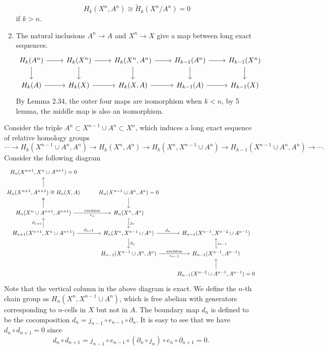 \documentclass[a4paper, 12pt]{article}
\begin{document}
\begin{solution}
\begin{claimproof}
\begin{enumerate}[(1)]
\[H_k(X^n,A^n)\cong \tilde{H}_k(X^n/A^n)=0\]
if \(k>n\).
\item The natural inclusions \(A^n\rightarrow A\) and \(X^n\rightarrow X\) give a map between long exact sequences.
\[\begin{tikzcd}
	{H_k(A^n)} & {H_k(X^n)} & {H_k(X^n,A^n)} & {H_{k-1}(A^n)} & {H_{k-1}(X^n)} \\
	{H_k(A)} & {H_k(X)} & {H_k(X,A)} & {H_{k-1}(A)} & {H_{k-1}(X)}
	\arrow[from=1-1, to=1-2]
	\arrow[from=1-1, to=2-1]
	\arrow[from=1-2, to=1-3]
	\arrow[from=1-2, to=2-2]
	\arrow[from=1-3, to=1-4]
	\arrow[from=1-3, to=2-3]
	\arrow[from=1-4, to=1-5]
	\arrow[from=1-4, to=2-4]
	\arrow[from=1-5, to=2-5]
	\arrow[from=2-1, to=2-2]
	\arrow[from=2-2, to=2-3]
	\arrow[from=2-3, to=2-4]
	\arrow[from=2-4, to=2-5]
\end{tikzcd}\]
By Lemma 2.34, the outer four maps are isomorphism when \(k<n\), by 5 lemma, the middle map is also an isomorphism.
\end{enumerate}
\end{claimproof}

Consider the triple \(A^n\subset X^{n-1}\cup A^n\subset X^n\), which induces a long exact sequence of relative homology groups 
\[\cdots\rightarrow H_k(X^{n-1}\cup A^n,A^n)\rightarrow H_k(X^n,A^n)\rightarrow H_k(X^n,X^{n-1}\cup A^n)\rightarrow H_{k-1}(X^{n-1}\cup A^n,A^n)\rightarrow \cdots.\]
Consider the following diagram 
\[\begin{tikzcd}
	{H_n(X^{n+1},X^n\cup A^{n+1})=0} \\
	{H_n(X^{n+1},A^{n+1})\cong H_n(X,A)} & {H_n(X^{n-1}\cup A^n,A^n)=0} \\
	{H_n(X^n\cup A^{n+1},A^{n+1})} & {H_n(X^n,A^n)} \\
	{H_{n+1}(X^{n+1},X^n\cup A^{n+1})} & {H_n(X^n,X^{n-1}\cup A^n)} & {H_{n-1}(X^{n-1},X^{n-2}\cup A^{n-1})} \\
	& {H_{n-1}(X^{n-1}\cup A^n,A^n)} & {H_{n-1}(X^{n-1},A^{n-1})} \\
	&& {H_{n-1}(X^{n-2}\cup A^{n-1},A^{n-1})=0}
	\arrow[from=2-1, to=1-1]
	\arrow[from=2-2, to=3-2]
	\arrow[two heads, from=3-1, to=2-1]
	\arrow["{e_n}"',"\text{excision}", from=3-1, to=3-2]
	\arrow["{j_n}", hook, from=3-2, to=4-2]
	\arrow["{\partial_{n+1}}", from=4-1, to=3-1]
	\arrow["{d_{n+1}}", from=4-1, to=4-2]
	\arrow["{d_n}", from=4-2, to=4-3]
	\arrow["{\partial_n}", from=4-2, to=5-2]
	\arrow["{e_{n-1}}"', "\text{excision}",from=5-2, to=5-3]
	\arrow["{j_{n-1}}"', hook', from=5-3, to=4-3]
	\arrow[from=6-3, to=5-3]
\end{tikzcd}\]
Note that the vertical column in the above diagram is exact. We define the \(n\)-th chain group as \(H_n(X^n,X^{n-1}\cup A^n)\), which is free abelian with generators corresponding to \(n\)-cells in \(X\) but not in \(A\). The boundary map \(d_n\) is 
defined to be the cocomposition \(d_n=j_{n-1}\circ e_{n-1}\circ \partial_n\). It is easy to see that we have \(d_n\circ d_{n+1}=0\) since 
\[d_n\circ d_{n+1}=j_{n-1}\circ e_{n-1} \circ (\partial_n\circ j_n)\circ e_n\circ \partial_{n+1}=0.\]


\end{solution}
\end{document}
